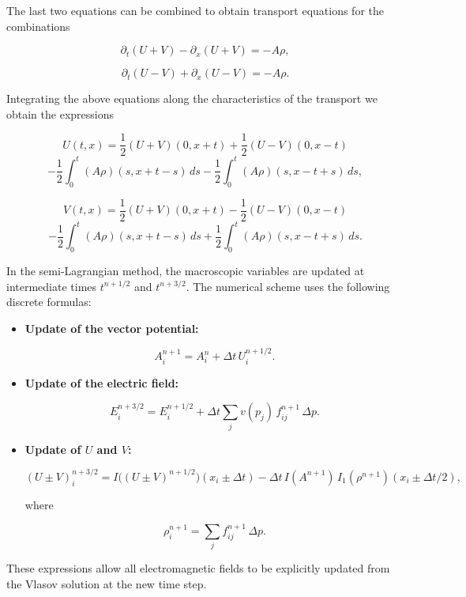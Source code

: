 \documentclass[11pt,a4paper,twoside,pdf]{article}
\numberwithin{equation}{section}
\begin{document}
The last two equations can be combined to obtain transport equations
for the combinations




\[
\partial_t(U+V) - \partial_x(U+V) = -A\rho,
\]




\[
\partial_t(U-V) + \partial_x(U-V) = -A\rho.
\]




Integrating the above equations along the characteristics of the transport we
obtain the expressions


\[
U(t,x) = \frac{1}{2}(U+V)(0,x+t) + \frac{1}{2}(U-V)(0,x-t)
\]
\[
- \frac{1}{2}\int_0^t (A\rho)(s,x+t-s)\,ds
- \frac{1}{2}\int_0^t (A\rho)(s,x-t+s)\,ds,
\]




\[
V(t,x) = \frac{1}{2}(U+V)(0,x+t) - \frac{1}{2}(U-V)(0,x-t)
\]
\[
- \frac{1}{2}\int_0^t (A\rho)(s,x+t-s)\,ds
+ \frac{1}{2}\int_0^t (A\rho)(s,x-t+s)\,ds.
\]





In the semi-Lagrangian method, the macroscopic variables are updated at intermediate
times $t^{n+1/2}$ and $t^{n+3/2}$. The numerical scheme uses the following
discrete formulas:

\begin{itemize}
\item \textbf{Update of the vector potential:}


\[
A^{n+1}_i = A^n_i + \Delta t\,U^{n+1/2}_i.
\]



\item \textbf{Update of the electric field:}


\[
E^{n+3/2}_i = E^{n+1/2}_i + \Delta t\sum_j v(p_j)\,f^{n+1}_{ij}\,\Delta p.
\]



\item \textbf{Update of $U$ and $V$:}


\[
(U\pm V)^{n+3/2}_i =
I\big((U\pm V)^{n+1/2}\big)(x_i\pm\Delta t)
-\Delta t\,I(A^{n+1})\,I_1(\rho^{n+1})(x_i\pm\Delta t/2),
\]


where


\[
\rho^{n+1}_i = \sum_j f^{n+1}_{ij}\,\Delta p.
\]


\end{itemize}

These expressions allow all electromagnetic fields to be explicitly
updated from the Vlasov solution at the new time step.
\end{document}
